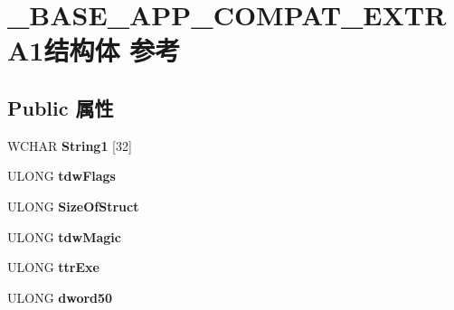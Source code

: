 \hypertarget{struct___b_a_s_e___a_p_p___c_o_m_p_a_t___e_x_t_r_a1}{}\section{\+\_\+\+B\+A\+S\+E\+\_\+\+A\+P\+P\+\_\+\+C\+O\+M\+P\+A\+T\+\_\+\+E\+X\+T\+R\+A1结构体 参考}
\label{struct___b_a_s_e___a_p_p___c_o_m_p_a_t___e_x_t_r_a1}
\subsection*{Public 属性}
\begin{DoxyCompactItemize}
\item 
\mbox{\label{struct___b_a_s_e___a_p_p___c_o_m_p_a_t___e_x_t_r_a1_a6c5bd6c6bca7716a82102db645dbe7ab}} 
W\+C\+H\+AR {\bfseries String1} \mbox{[}32\mbox{]}
\item 
\mbox{\label{struct___b_a_s_e___a_p_p___c_o_m_p_a_t___e_x_t_r_a1_a05f79f9aa0c316db41584e7f8a76b4a9}} 
U\+L\+O\+NG {\bfseries tdw\+Flags}
\item 
\mbox{\label{struct___b_a_s_e___a_p_p___c_o_m_p_a_t___e_x_t_r_a1_a5663d50b098ee9cb0ec2068418d7a256}} 
U\+L\+O\+NG {\bfseries Size\+Of\+Struct}
\item 
\mbox{\label{struct___b_a_s_e___a_p_p___c_o_m_p_a_t___e_x_t_r_a1_aef131b4d1722994cde0df4be9b5c8cae}} 
U\+L\+O\+NG {\bfseries tdw\+Magic}
\item 
\mbox{\label{struct___b_a_s_e___a_p_p___c_o_m_p_a_t___e_x_t_r_a1_ae238d51e0505f3458933de2f338b26cc}} 
U\+L\+O\+NG {\bfseries ttr\+Exe}
\item 
\mbox{\label{struct___b_a_s_e___a_p_p___c_o_m_p_a_t___e_x_t_r_a1_a1207ffe5ff076e1b7be6709372431f5c}} 
U\+L\+O\+NG {\bfseries dword50}
\item 
\mbox{\label{struct___b_a_s_e___a_p_p___c_o_m_p_a_t___e_x_t_r_a1_a679b31c3526a71f42c25ca88ea07267c}} 

\end{DoxyCompactItemize}
